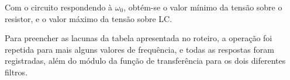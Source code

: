 Com o circuito respondendo à $\omega_0$, obtém-se o valor mínimo da tensão sobre o resistor, e o valor máximo da tensão sobre LC.

Para preencher as lacunas da tabela apresentada no roteiro, a operação foi repetida para mais alguns valores de frequência, e todas as respostas foram registradas, além do módulo da função de transferência para os dois diferentes filtros.

\begin{table}[H]
	\caption{Respostas do circuito RLC paralelo.}

	\begin{center}
\end{center}
\end{table}
